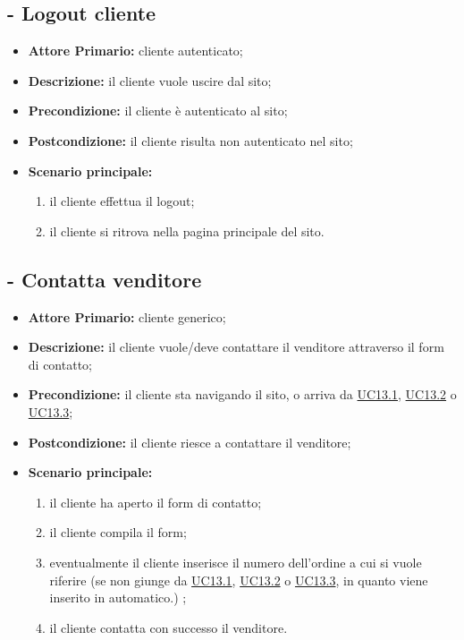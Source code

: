 \stepUserCase
\subsection{ - Logout cliente}
\begin{itemize}
    \item \textbf{Attore Primario:} cliente autenticato;
    \item \textbf{Descrizione:} il cliente vuole uscire dal sito;
    \item \textbf{Precondizione:} il cliente è autenticato al sito;
    \item \textbf{Postcondizione:} il cliente risulta non autenticato nel sito;
    \item \textbf{Scenario principale:}
          \begin{enumerate}
              \item il cliente effettua il logout;
              \item il cliente si ritrova nella pagina principale del sito.
          \end{enumerate}
\end{itemize}

\stepUserCase
\subsection{ - Contatta venditore}
\begin{itemize}
    \item \textbf{Attore Primario:} cliente generico;
    \item \textbf{Descrizione:} il cliente vuole/deve contattare il venditore attraverso il form di contatto;
    \item \textbf{Precondizione:} il cliente sta navigando il sito, o arriva da \hyperref[UC13.1]{UC13.1}, \hyperref[UC13.2]{UC13.2} o \hyperref[UC13.3]{UC13.3};
    \item \textbf{Postcondizione:} il cliente riesce a contattare il venditore;
    \item \textbf{Scenario principale:}
          \begin{enumerate}
              \item il cliente ha aperto il form di contatto;
              \item il cliente compila il form;
              \item eventualmente il cliente inserisce il numero dell'ordine a cui si vuole riferire (se non giunge da \hyperref[UC13.1]{UC13.1}, \hyperref[UC13.2]{UC13.2} o \hyperref[UC13.3]{UC13.3}, in quanto viene inserito in automatico.) ;
              \item il cliente contatta con successo il venditore.
          \end{enumerate}
\end{itemize}


